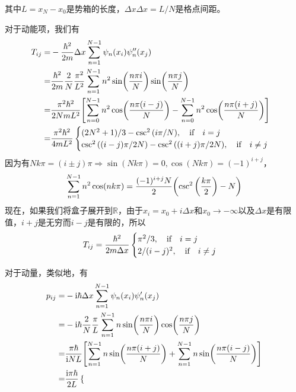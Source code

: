 \documentclass[UTF8,12pt]{article}
\begin{document}
        其中$L=x_N-x_0$是势箱的长度，$\Delta x$$\Delta x=L/N$是格点间距。\par
        对于动能项，我们有
        \begin{align}
            T_{ij}=&-\frac{\hbar^2}{2m}\Delta x\sum_{n=1}^{N-1}{\psi_n(x_i)\psi''_n(x_j)} \\
            =&\frac{\hbar^2}{2m}\frac{2}{N}\frac{\pi^2}{L^2}\sum_{n=1}^{N-1}{n^2\sin(\frac{n\pi i}{N})\sin(\frac{n\pi j}{N})} \\
            =&\frac{\pi^2\hbar^2}{2NmL^2}\qty[\sum_{n=0}^{N-1}{n^2\cos(\frac{n\pi(i-j)}{N})}-\sum_{n=0}^{N-1}{n^2\cos(\frac{n\pi(i+j)}{N})}] \\
            =&\frac{\pi^2\hbar^2}{4mL^2}\begin{cases}
                (2N^2+1)/3-\csc^2\qty(i\pi/N),\qif i=j\\
                \csc^2\qty((i-j)\pi/2N)-\csc^2\qty((i+j)\pi/2N),\qif i\neq j
            \end{cases}
        \end{align}
        因为有$Nk\pi=(i\pm j)\pi\Rightarrow\sin(Nk\pi)=0,\cos(Nk\pi)=(-1)^{i+j}$，
        \begin{align}
            \sum_{n=1}^{N-1}{n^2\cos(nk\pi)}=\frac{(-1)^{i+j}N}{2}\qty(\csc^2\qty(\frac{k\pi}{2})-N)
        \end{align}
        现在，如果我们将盒子展开到$\mathbb{R}$，由于$x_i=x_0+i\Delta x$和$x_0\rightarrow-\infty$以及$\Delta x$是有限值，$i+j$是无穷而$i-j$是有限的，所以
        \begin{equation}
            T_{ij}=\frac{\hbar^2}{2m\Delta x}\begin{cases}
                \pi^2/3,\qif i=j \\
                2/(i-j)^2,\qif i\neq j
            \end{cases}
        \end{equation}\par
        对于动量，类似地，有
        \begin{align}
            p_{ij}=&-\mathrm{i}\hbar\Delta x\sum_{n=1}^{N-1}{\psi_n(x_i)\psi'_n(x_j)} \\
            =&-\mathrm{i}\hbar\frac{2}{N}\frac{\pi}{L}\sum_{n=1}^{N-1}{n\sin(\frac{n\pi i}{N})\cos(\frac{n\pi j}{N})} \\
            =&\frac{\pi\hbar}{\mathrm{i}NL}\qty[\sum_{n=1}^{N-1}{n\sin(\frac{n\pi(i+j)}{N})}+\sum_{n=1}^{N-1}{n\sin(\frac{n\pi(i-j)}{N})}] \\
            =&\frac{\mathrm{i}\pi\hbar}{2L}\begin{cases}

\end{cases}
\end{align}$$
\end{document}
